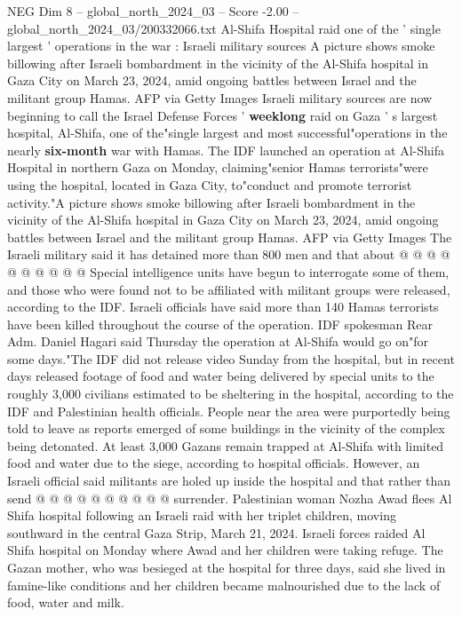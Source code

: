 \begin{textsample}{NEG Dim 8 – global\_north\_2024\_03 – Score -2.00 – global\_north\_2024\_03/200332066.txt}  \label{ex:f8_neg_218}
Al-Shifa Hospital raid one of the ' single largest ' operations in the war : Israeli military sources A picture shows smoke billowing after Israeli bombardment in the vicinity of the Al-Shifa hospital in Gaza City on March 23, 2024, amid ongoing battles between Israel and the militant group Hamas.
AFP via Getty Images Israeli military sources are now beginning to call the Israel Defense Forces ' \textbf{weeklong} raid on Gaza ' s largest hospital, Al-Shifa, one of the"single largest and most successful"operations in the nearly \textbf{six-month} war with Hamas.
The IDF launched an operation at Al-Shifa Hospital in northern Gaza on Monday, claiming"senior Hamas terrorists"were using the hospital, located in Gaza City, to"conduct and promote terrorist activity."A picture shows smoke billowing after Israeli bombardment in the vicinity of the Al-Shifa hospital in Gaza City on March 23, 2024, amid ongoing battles between Israel and the militant group Hamas.
AFP via Getty Images The Israeli military said it has detained more than 800 men and that about @ @ @ @ @ @ @ @ @ @ Special intelligence units have begun to interrogate some of them, and those who were found not to be affiliated with militant groups were released, according to the IDF.
Israeli officials have said more than 140 Hamas terrorists have been killed throughout the course of the operation.
IDF spokesman Rear Adm.
Daniel Hagari said Thursday the operation at Al-Shifa would go on"for some days."The IDF did not release video Sunday from the hospital, but in recent days released footage of food and water being delivered by special units to the roughly 3,000 civilians estimated to be sheltering in the hospital, according to the IDF and Palestinian health officials.
People near the area were purportedly being told to leave as reports emerged of some buildings in the vicinity of the complex being detonated.
At least 3,000 Gazans remain trapped at Al-Shifa with limited food and water due to the siege, according to hospital officials.
However, an Israeli official said militants are holed up inside the hospital and that rather than send @ @ @ @ @ @ @ @ @ @ surrender.
Palestinian woman Nozha Awad flees Al Shifa hospital following an Israeli raid with her triplet children, moving southward in the central Gaza Strip, March 21, 2024.
Israeli forces raided Al Shifa hospital on Monday where Awad and her children were taking refuge.
The Gazan mother, who was besieged at the hospital for three days, said she lived in famine-like conditions and her children became malnourished due to the lack of food, water and milk.

\end{textsample}

